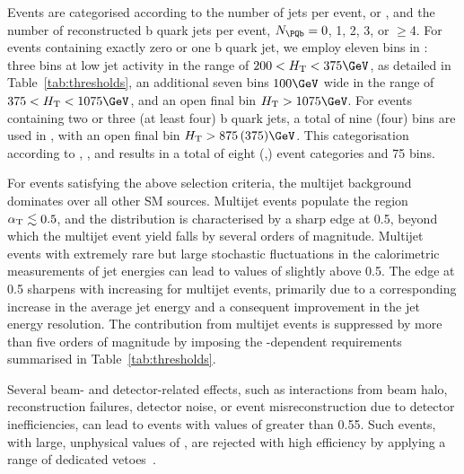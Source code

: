 Events are categorised according to the number of jets per event,
\njetlow or \njethigh, and the number of reconstructed b quark jets
per event, $\nb = 0$, 1, 2, 3, or $\geq$4.  For events containing
exactly zero or one b quark jet, we employ eleven bins in \scalht:
three bins at low jet activity in the range of $200 < \scalht <
375\GeV$, as detailed in Table~\ref{tab:thresholds}, an additional
seven bins $100\GeV$ wide in the range of $375 < \scalht < 1075\GeV$,
and an open final bin $\scalht > 1075\GeV$.  For events containing two
or three (at least four) b quark jets, a total of nine (four) bins are
used in \scalht, with an open final bin $\scalht > 875\, (375)\GeV$.
This categorisation according to \njet, \nb, and \scalht results in a
total of eight (\njet,\nb) event categories and 75
bins.%

For events satisfying the above selection criteria, the multijet
background dominates over all other SM sources. Multijet events
populate the region $\alpha_\mathrm{T} \lesssim 0.5$, and the \alphat
distribution is characterised by a sharp edge at 0.5, beyond which the
multijet event yield falls by several orders of magnitude. Multijet
events with extremely rare but large stochastic fluctuations in the
calorimetric measurements of jet energies can lead to values of
\alphat slightly above 0.5. The edge at 0.5 sharpens with increasing
\scalht for multijet events, primarily due to a corresponding increase
in the average jet energy and a consequent improvement in the jet
energy resolution. The contribution from multijet events is suppressed
by more than five orders of magnitude by imposing the
\scalht-dependent \alphat requirements summarised in
Table~\ref{tab:thresholds}.

Several beam- and detector-related effects, such as interactions from
beam halo, reconstruction failures, detector noise, or event
misreconstruction due to detector inefficiencies, can lead to events
with values of \alphat greater than 0.55. Such events, with large,
unphysical values of \ptvecmiss, are rejected with high efficiency by
applying a range of dedicated vetoes~\cite{RA1Paper2012, cms-met}.

